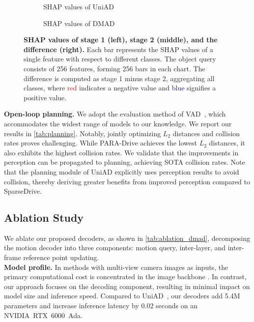 \begin{figure*}[h!]
    \centering
    \begin{subfigure}{1\linewidth}
        \centering
        
        
        
        \caption{SHAP values of UniAD}
        \label{fig:shap_uniad}
    \end{subfigure}
    \begin{subfigure}{1\linewidth}
        \centering
        
        
        
        \caption{SHAP values of DMAD}
        \label{fig:shap_dmad}
    \end{subfigure}
    \label{fig:shap}
    \caption{\textbf{SHAP values of stage 1 (left), stage 2 (middle), and the difference (right).} Each bar represents the SHAP values of a single feature with respect to different classes. The object query consists of 256 features, forming 256 bars in each chart. The difference is computed as stage 1 minus stage 2, aggregating all classes, where \textcolor{red}{red} indicates a negative value and \textcolor{blue}{blue} signifies a positive value.}
\end{figure*}

\textbf{Open-loop planning.} 
We adopt the evaluation method of VAD~\cite{jiang2023vad}, which accommodates the widest range of models to our knowledge.
We report our results in \cref{tab:planning}. 
Notably, jointly optimizing $L_2$ distances and collision rates proves challenging. While PARA-Drive achieves the lowest $L_2$ distances, it also exhibits the highest collision rates.
We validate that the improvements in perception can be propagated to planning, achieving SOTA collision rates.
Note that the planning module of UniAD explicitly uses perception results to avoid collision, thereby deriving greater benefits from improved perception compared to SparseDrive.





\subsection{Ablation Study}
We ablate our proposed decoders, as shown in \cref{tab:ablation_dmad}, decomposing the motion decoder into three components: motion query, inter-layer, and inter-frame reference point updating. \\

\textbf{Model profile.} In methods with multi-view camera images as inputs, the primary computational cost is concentrated in the image backbone \cite{li2022bevformer}. In contrast, our approach focuses on the decoding component, resulting in minimal impact on model size and inference speed. Compared to UniAD~\cite{hu2023planning}, our decoders add 5.4M parameters and increase inference latency by 0.02 seconds on an \mbox{NVIDIA RTX 6000 Ada.}\\

